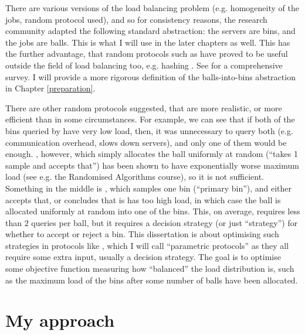 There are various versions of the load balancing problem (e.g. homogeneity of the jobs, random protocol used), and so for consistency reasons, the research community adapted the following standard abstraction: the servers are bins, and the jobs are balls. This is what I will use in the later chapters as well. This has the further advantage, that random protocols such as \TwoChoice have proved to be useful outside the field of load balancing too, e.g. hashing \cite{azar1999twochoice}. See \cite{udi2017ballsintobinslandscape} for a comprehensive survey. I will provide a more rigorous definition of the balls-into-bins abstraction in Chapter \ref{preparation}.


There are other random protocols suggested, that are more realistic, or more efficient than \TwoChoice in some circumstances. For example, we can see that if both of the bins queried by \TwoChoice have very low load, then, it was unnecessary to query both (e.g. communication overhead, slows down servers), and only one of them would be enough. \OneChoice, however, which simply allocates the ball uniformly at random (``takes 1 sample and accepts that'') has been shown to have exponentially worse maximum load (see e.g. the Randomised Algorithms course), so it is not sufficient. Something in the middle is \TwoThinning \cite{feldheim2021thinning}, which samples one bin (``primary bin''), and either accepts that, or concludes that is has too high load, in which case the ball is allocated uniformly at random into one of the bins. This, on average, requires less than $2$ queries per ball, but it requires a decision strategy (or just ``strategy'') for whether to accept or reject a bin. This dissertation is about optimising such strategies in protocols like \TwoThinning, which I will call ``parametric protocols'' as they all require some extra input, usually a decision strategy. The goal is to optimise some objective function measuring how ``balanced'' the load distribution is, such as the maximum load of the bins after some number of balls have been allocated.



\section{My approach}

